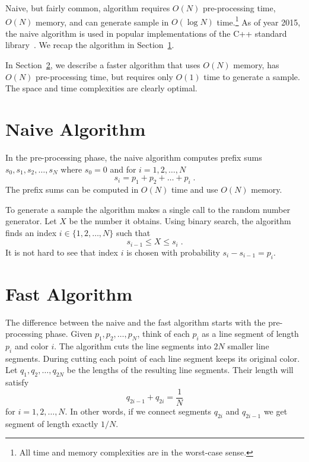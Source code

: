 \documentclass{article}
\begin{document}
Naive, but fairly common, algorithm requires $O(N)$ pre-processing time, $O(N)$
memory, and can generate sample in $O(\log N)$ time.\footnote{All time and
memory complexities are in the worst-case sense.} As of year 2015, the naive
algorithm is used in popular implementations of the C++ standard
library~\cite{gcc-libstdc++,clang-libc++}.  We recap the algorithm in
Section~\ref{section:naive-algorithm}.

In Section~\ref{section:fast-algorithm}, we describe a faster algorithm that
uses $O(N)$ memory, has $O(N)$ pre-processing time, but requires only $O(1)$
time to generate a sample.  The space and time complexities are clearly
optimal.

\section{Naive Algorithm}
\label{section:naive-algorithm}

In the pre-processing phase, the naive algorithm computes prefix sums $s_0,
s_1, s_2, \dots, s_N$ where $s_0 = 0$ and for $i=1,2,\dots,N$
$$
s_i = p_1 + p_2 + \dots + p_i \; .
$$
The prefix sums can be computed in $O(N)$ time and use $O(N)$ memory.

To generate a sample the algorithm makes a single call to the random number
generator. Let $X$ be the number it obtains. Using
binary search, the algorithm finds an index $i \in \{1,2,\dots,N\}$ such that
$$
s_{i-1} \le X \le s_i \; .
$$
It is not hard to see that index $i$ is chosen with probability $s_i - s_{i-1}
= p_i$.

\section{Fast Algorithm}
\label{section:fast-algorithm}

The difference between the naive and the fast algorithm starts with the
pre-processing phase.  Given $p_1, p_2, \dots, p_N$, think of each $p_i$ as a
line segment of length $p_i$ and color $i$.  The algorithm cuts the line
segments into $2N$ smaller line segments. During cutting each point of each
line segment keeps its original color. Let $q_1, q_2, \dots, q_{2N}$ be the
lengths of the resulting line segments. Their length will satisfy
\begin{equation}
\label{equation:two-segments}
q_{2i - 1} + q_{2i} = \frac{1}{N}
\end{equation}
for $i=1,2,\dots,N$.  In other words, if we connect segments $q_{2i}$ and
$q_{2i-1}$ we get segment of length exactly $1/N$.
\end{document}
